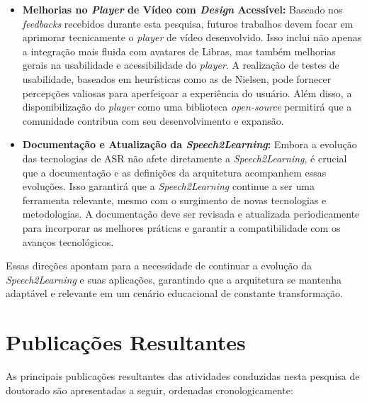 \begin{itemize}
    \item \textbf{Melhorias no \textit{Player} de Vídeo com \textit{Design} Acessível:} Baseado nos \textit{feedbacks} recebidos durante esta pesquisa, futuros trabalhos devem focar em aprimorar tecnicamente o \textit{player} de vídeo desenvolvido. Isso inclui não apenas a integração mais fluida com avatares de Libras, mas também melhorias gerais na usabilidade e acessibilidade do \textit{player}. A realização de testes de usabilidade, baseados em heurísticas como as de Nielsen, pode fornecer percepções valiosas para aperfeiçoar a experiência do usuário. Além disso, a disponibilização do \textit{player} como uma biblioteca \textit{open-source} permitirá que a comunidade contribua com seu desenvolvimento e expansão.

    \item \textbf{Documentação e Atualização da \textit{Speech2Learning}:} Embora a evolução das tecnologias de ASR não afete diretamente a \textit{Speech2Learning}, é crucial que a documentação e as definições da arquitetura acompanhem essas evoluções. Isso garantirá que a \textit{Speech2Learning} continue a ser uma ferramenta relevante, mesmo com o surgimento de novas tecnologias e metodologias. A documentação deve ser revisada e atualizada periodicamente para incorporar as melhores práticas e garantir a compatibilidade com os avanços tecnológicos.

\end{itemize}

Essas direções apontam para a necessidade de continuar a evolução da \textit{Speech2Learning} e suas aplicações, garantindo que a arquitetura se mantenha adaptável e relevante em um cenário educacional de constante transformação.

\section{Publicações Resultantes}

As principais publicações resultantes das atividades conduzidas nesta pesquisa de doutorado são apresentadas a seguir, ordenadas cronologicamente:

